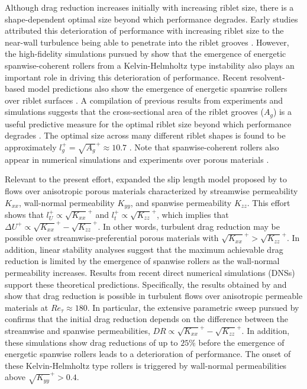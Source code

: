 \documentclass[letterpaper,11pt]{article}
\newcommand{\kpxx}{\sqrt{K_{xx}}^+}
\newcommand{\kpyy}{\sqrt{K_{yy}}^+}
\newcommand{\kpzz}{\sqrt{K_{zz}}^+}
\newcommand{\Ret}{Re_\tau}
\begin{document}
Although drag reduction increases initially with increasing riblet size, there is a shape-dependent optimal size beyond which performance degrades. Early studies attributed this deterioration of performance with increasing riblet size to the near-wall turbulence being able to penetrate into the riblet grooves \citep{choi1993direct,lee2001flow}. However, the high-fidelity simulations pursued by \citet{garcia2011hydrodynamic} show that the emergence of energetic spanwise-coherent rollers from a Kelvin-Helmholtz type instability also plays an important role in driving this deterioration of performance.  Recent resolvent-based model predictions also show the emergence of energetic spanwise rollers over riblet surfaces \citep{chavarin2020resolvent}. A compilation of previous results from experiments and simulations suggests that the cross-sectional area of the riblet grooves ($A_g$) is a useful predictive measure for the optimal riblet size beyond which performance degrades \citep{garcia2011drag}. The optimal size across many different riblet shapes is found to be approximately $l_g^+ = \sqrt{A_g}^+ \approx 10.7$ \citep{garcia2011drag,garcia2011hydrodynamic,chavarin2020resolvent}.
Note that spanwise-coherent rollers also appear in numerical simulations and experiments over porous materials \citep{breugem2006influence,rosti2015direct, chandesris2013direct,kuwata2017direct,suga2018anisotropic}. 

Relevant to the present effort, \citet{nabil_garcia_dragreduction} expanded the slip length model proposed by \citet{luchini1991resistance} to flows over anisotropic porous materials characterized by streamwise permeability $K_{xx}$, wall-normal permeability $K_{yy}$, and spanwise permeability $K_{zz}$. This effort shows that $l_U^+ \propto \kpxx$ and $l_t^+ \propto \kpzz$, which implies that $\Delta U^+ \propto \kpxx - \kpzz$.  In other words, turbulent drag reduction may be possible over streamwise-preferential porous materials with $\kpxx > \kpzz$. In addition, linear stability analyses suggest that the maximum achievable drag reduction is limited by the emergence of spanwise rollers as the wall-normal permeability increases.  Results from recent direct numerical simulations (DNSs) support these theoretical predictions.  Specifically, the results obtained by \citet{rosti2018turbulent} and \citet{gomez2019turbulent} show that drag reduction is possible in turbulent flows over anisotropic permeable materials at $\Ret \approx 180$.  In particular, the extensive parametric sweep pursued by \citet{gomez2019turbulent} confirms that the initial drag reduction depends on the difference between the streamwise and spanwise permeabilities, $DR \propto \kpxx - \kpzz$.  In addition, these simulations show drag reductions of up to $25\%$ before the emergence of energetic spanwise rollers leads to a deterioration of performance.  The onset of these Kelvin-Helmholtz type rollers is triggered by wall-normal permeabilities above $\kpyy>0.4$.  
\end{document}
